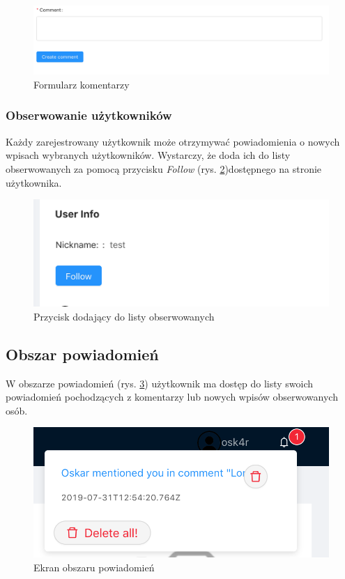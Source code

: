\documentclass[declaration,shortabstract,polish,inz]{iithesis}
\begin{document}
\begin{figure}[H]
    \centering
    \includegraphics[width=\linewidth]{images/komentarz.png}
    \caption{Formularz komentarzy}
    \label{fig:comment}
\end{figure}

\subsubsection{Obserwowanie użytkowników}
Każdy zarejestrowany użytkownik może otrzymywać powiadomienia o nowych wpisach wybranych użytkowników. Wystarczy, że doda ich do listy obserwowanych za pomocą przycisku \textit{Follow} (rys. \ref{fig:follow})dostępnego na stronie użytkownika.

\begin{figure}[h!]
    \centering
    \includegraphics[width=\textwidth]{images/follow.png}
    \caption{Przycisk dodający do listy obserwowanych}
    \label{fig:follow}
\end{figure}

\subsection{Obszar powiadomień}
W obszarze powiadomień (rys. \ref{fig:notification}) użytkownik ma dostęp do listy swoich powiadomień pochodzących z komentarzy lub nowych wpisów obserwowanych osób.
\begin{figure}[H]
    \centering
    \includegraphics[width=\linewidth]{images/powiadomienia.png}
    \caption{Ekran obszaru powiadomień}
    \label{fig:notification}
\end{figure}
\end{document}
